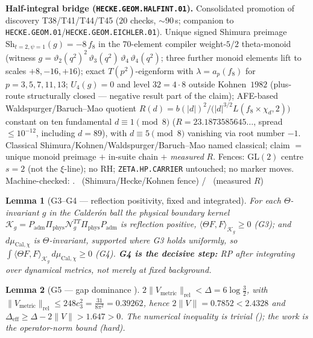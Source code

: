 \documentclass[11pt,a4paper]{article}
\newcommand{\cthree}{c_3}
\newtheorem{lemma}{Lemma}
\begin{document}
\par\smallskip\noindent\textbf{Half-integral bridge
(\texttt{HECKE.GEOM.HALFINT.01}).}
Consolidated promotion of discovery T38/T41/T44/T45 ($20$ checks, $\sim90$\,s; companion
to \texttt{HECKE.GEOM.01}/\texttt{HECKE.GEOM.EICHLER.01}). Unique signed Shimura preimage
$\mathrm{Sh}_{t=2,\psi=1}(g)=-8\,f_8$ in the $70$-element compiler weight-$5/2$
theta-monoid (witness
$g=\vartheta_2(q^2)^2\,\vartheta_3(q^2)\,\vartheta_4\,\vartheta_4(q^2)$; three further
monoid elements lift to scales $+8,-16,+16$); exact $T(p^2)$-eigenform with
$\lambda=a_p(f_8)$ for $p=3,5,7,11,13$; $U_4(g)=0$ and level $32=4\cdot8$ outside
Kohnen~$1982$ (plus-route structurally closed --- negative result part of the claim);
AFE-based Waldspurger/Baruch--Mao quotient
$R(d)=b(|d|)^2\big/\bigl(|d|^{3/2}L(f_8\times\chi_d,2)\bigr)$ constant on ten
fundamental $d\equiv1\pmod8$ ($R=23.1873585645\ldots$, spread $\le10^{-12}$, including
$d=89$), with $d\equiv5\pmod8$ vanishing via root number $-1$. Classical
Shimura/Kohnen/Waldspurger/Baruch--Mao named classical; claim $=$ unique monoid preimage
$+$ in-suite chain $+$ \emph{measured} $R$. Fences: GL$(2)$ centre $s=2$ (not the
$\xi$-line); no RH; \texttt{ZETA.HP.CARRIER} untouched; no marker moves.
Machine-checked: .
\mE\ (Shimura/Hecke/Kohnen fence) / \mC\ (measured $R$)


\begin{lemma}[G3--G4 --- reflection positivity, fixed and integrated]
For each $\Theta$-invariant $g$ in the Calderón ball the physical boundary kernel
$\mathcal K_g=P_{\mathrm{adm}}\Pi_{\mathrm{phys}}\mathcal N_g^{TT}\Pi_{\mathrm{phys}}P_{\mathrm{adm}}$ is
reflection positive, $\langle\Theta F,F\rangle_{\mathcal K_g}\ge0$ (G3); and $d\mu_{\mathrm{Cal},\chi}$ is
$\Theta$-invariant, supported where G3 holds uniformly, so
$\int\langle\Theta F,F\rangle_{\mathcal K_g}\,d\mu_{\mathrm{Cal},\chi}\ge0$ (G4). \textbf{G4 is the decisive
step:} RP after integrating over dynamical metrics, not merely at fixed background.
\end{lemma}

\begin{lemma}[G5 --- gap dominance \mE]
$2\|V_{\mathrm{metric}}\|_{\mathrm{rel}}<\Delta=6\log\tfrac32$, with
$\|V_{\mathrm{metric}}\|_{\mathrm{rel}}\le248\cthree^2=\tfrac{31}{8\pi^2}=0.39262$, hence
$2\|V\|=0.7852<2.4328$ and $\Delta_{\mathrm{eff}}\ge\Delta-2\|V\|>1.647>0$. The numerical inequality is
trivial (); the work is the operator-norm bound (hard).
\end{lemma}
\end{document}
